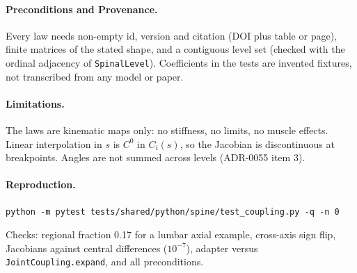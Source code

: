 \paragraph{Preconditions and Provenance.}
Every law needs non-empty id, version and citation (DOI plus table or page),
finite matrices of the stated shape, and a contiguous level set (checked with
the ordinal adjacency of \texttt{SpinalLevel}). Coefficients in the tests are
invented fixtures, not transcribed from any model or paper.

\paragraph{Limitations.}
The laws are kinematic maps only: no stiffness, no limits, no muscle effects.
Linear interpolation in $s$ is $C^0$ in $C_i(s)$, so the Jacobian is
discontinuous at breakpoints. Angles are not summed across levels
(ADR-0055 item 3).

\paragraph{Reproduction.}
\begin{verbatim}
python -m pytest tests/shared/python/spine/test_coupling.py -q -n 0
\end{verbatim}
Checks: regional fraction 0.17 for a lumbar axial example, cross-axis sign flip,
Jacobians against central differences ($10^{-7}$), adapter versus
\texttt{JointCoupling.expand}, and all preconditions.
